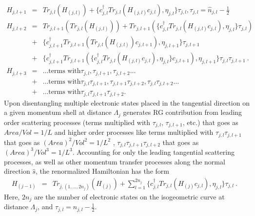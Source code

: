 \documentclass[aps,prb,preprint,groupedaddress]{revtex4-2}
\begin{document}
\begin{eqnarray}
H_{j,l+1}&=&Tr_{j,l}(H_{(j,l)})+\lbrace c^{\dagger}_{j,l}Tr_{j,l}(H_{(j,l)}c_{j,l}),\eta_{j,l}\rbrace\tau_{j,l}, \tau_{j,l}=\hat{n}_{j,l}-\frac{1}{2}\nonumber\\ 
H_{j,l+2}&=&Tr_{j,l+1}(Tr_{j,l}(H_{(j,l)}))+Tr_{j,l+1}(\lbrace c^{\dagger}_{j,l}Tr_{j,l}(H_{(j,l)}c_{j,l}),\eta_{j,l}\rbrace\tau_{j,l})\nonumber\\
&+&\lbrace c^{\dagger}_{j,l+1}Tr_{j,l+1}(Tr_{j,l}(H_{(j,l)})c_{j,l+1}),\eta_{j,l+1}\rbrace\tau_{j,l+1}\nonumber\\
&+&\lbrace c^{\dagger}_{j,l+1}Tr_{j,l+1}(\lbrace c^{\dagger}_{j,l}Tr_{j,l}(H_{(j,l)}c_{j,l}),\eta_{j,l}\rbrace c_{j,l+1}),\eta_{j,l+1}\rbrace\tau_{j,l}\tau_{j,l+1}~.\nonumber\\
H_{j,l+3}&=&\ldots\text{terms with} \tau_{j,l}, \tau_{j,l+1}, \tau_{j,l+2}\ldots\nonumber\\
 &+& \ldots\text{terms with} \tau_{j,l}\tau_{j,l+1}, \tau_{j,l+1}\tau_{j,l+2}, \tau_{j,l}\tau_{j,l+2}\ldots\nonumber\\
 &+&\ldots\text{terms with}\tau_{j,l}\tau_{j,l+1}\tau_{j,l+2}.
\label{2ndDisentanglement}
\end{eqnarray}
Upon disentangling multiple electronic states placed in the tangential direction on a given momentum shell at distance $\Lambda_{j}$ generates RG contribution from leading order scattering processes (terms multiplied with $\tau_{j,l}$, $\tau_{j,l+1}$, etc.) that goes as $Area/Vol=1/L$ and higher order processes like terms multiplied with $\tau_{j,l}\tau_{j,l+1}$ that goes as $(Area)^{2}/Vol^{2}=1/L^{2}$ , $\tau_{j,l}\tau_{j,l+1}\tau_{j,l+2}$ that goes as $(Area)^{3}/Vol^{3}=1/L^{3}$. 
Accounting for only the leading tangential scattering processes, as well as other momentum transfer processes along the normal direction $\hat{s}$, the renormalized Hamiltonian has the form
\begin{eqnarray}
H_{(j-1)}&=&Tr_{j,(1,\ldots,2n_{j})}(H_{(j)})+\sum_{l=1}^{2n_{j}}\lbrace c^{\dagger}_{j,l}Tr_{j,l}(H_{(j)}c_{j,l}),\eta_{j,l}\rbrace\tau_{j,l}~.~~~\label{HRG}
\end{eqnarray}
Here, $2n_{j}$ are the number of electronic states on the isogeometric curve at distance $\Lambda_{j}$, and $\tau_{j,l}= n_{j,l}-\frac{1}{2}$.
\end{document}
